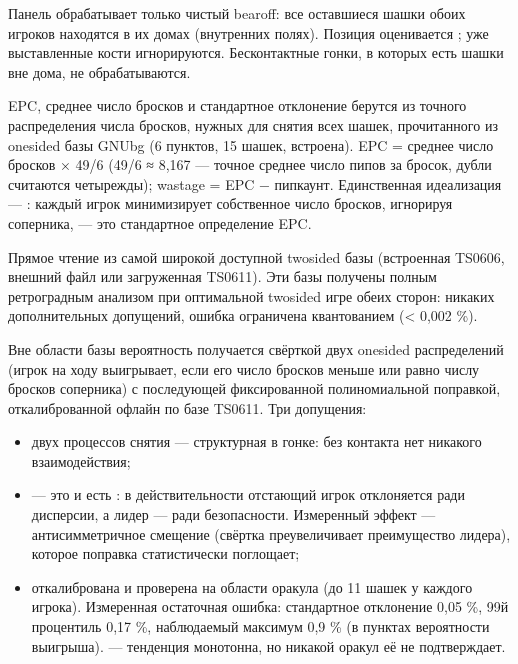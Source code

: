 \documentclass[letterpaper,10pt,russian]{sphinxmanual}
\begin{document}
\sphinxAtStartPar
{} Панель обрабатывает только чистый bearoff: все оставшиеся шашки обоих игроков находятся в их домах (внутренних полях). Позиция оценивается ; уже выставленные кости игнорируются. Бесконтактные гонки, в которых есть шашки вне дома, не обрабатываются.

\sphinxAtStartPar
{} EPC, среднее число бросков и стандартное отклонение берутся из точного распределения числа бросков, нужных для снятия всех шашек, прочитанного из one\sphinxhyphen{}sided базы GNUbg (6 пунктов, 15 шашек, встроена). EPC = среднее число бросков × 49/6 (49/6 ≈ 8,167 — точное среднее число пипов за бросок, дубли считаются четырежды); wastage = EPC − пипкаунт. Единственная идеализация — : каждый игрок минимизирует собственное число бросков, игнорируя соперника, — это стандартное определение EPC.

\sphinxAtStartPar
{} Прямое чтение из самой широкой доступной two\sphinxhyphen{}sided базы (встроенная TS\sphinxhyphen{}06\sphinxhyphen{}06, внешний файл или загруженная TS\sphinxhyphen{}06\sphinxhyphen{}11). Эти базы получены полным ретроградным анализом при оптимальной two\sphinxhyphen{}sided игре обеих сторон: никаких дополнительных допущений, ошибка ограничена квантованием (< 0,002 \%).

\sphinxAtStartPar
{} Вне области базы вероятность получается свёрткой двух one\sphinxhyphen{}sided распределений (игрок на ходу выигрывает, если его число бросков меньше или равно числу бросков соперника) с последующей фиксированной полиномиальной поправкой, откалиброванной офлайн по базе TS\sphinxhyphen{}06\sphinxhyphen{}11. Три допущения:
\begin{itemize}
\item {} 
\sphinxAtStartPar
{} двух процессов снятия — структурная в гонке: без контакта нет никакого взаимодействия;

\item {} 
\sphinxAtStartPar
{} — это и есть : в действительности отстающий игрок отклоняется ради дисперсии, а лидер — ради безопасности. Измеренный эффект — антисимметричное смещение (свёртка преувеличивает преимущество лидера), которое поправка статистически поглощает;

\item {} 
\sphinxAtStartPar
{} откалибрована и проверена на области оракула (до 11 шашек у каждого игрока). Измеренная остаточная ошибка: стандартное отклонение 0,05 \%, 99\sphinxhyphen{}й процентиль 0,17 \%, наблюдаемый максимум 0,9 \% (в пунктах вероятности выигрыша).  — тенденция монотонна, но никакой оракул её не подтверждает.

\end{itemize}
\end{document}
